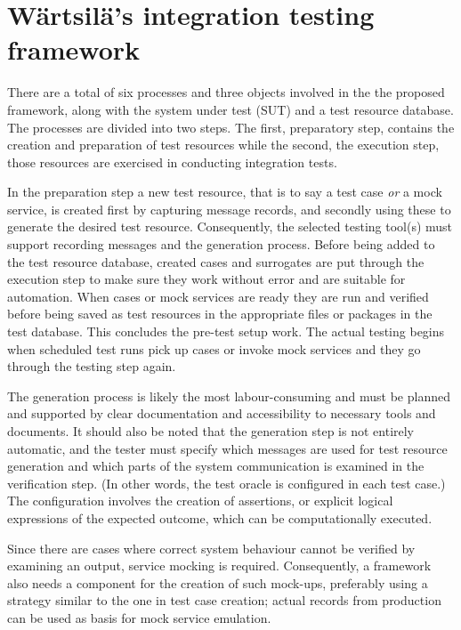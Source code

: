 \documentclass[12pt,a4paper,oneside,pdftex]{report}
\begin{document}
{\section{Wärtsilä's integration testing framework}

There are a total of six processes and three objects involved in the the proposed framework, along with the system under test (SUT) and a test resource database. The processes are divided into two steps. The first, preparatory step, contains the creation and preparation of test resources while the second, the execution step, those resources are exercised in conducting integration tests.

In the preparation step a new test resource, that is to say a test case \emph{or} a mock service, is created first by capturing message records, and secondly using these to generate the desired test resource. Consequently, 
the selected testing tool(s) must support recording messages and the generation process. Before being added to the test resource database, created cases and surrogates are put through the execution step to make sure they work without error and are suitable for automation. When cases or mock services are ready they are run and verified before being saved as test resources in the appropriate files or packages in the test database. This concludes the pre-test setup work. The actual testing begins when scheduled test runs pick up cases or invoke mock services and they go through the testing step again.

The generation process is likely the most labour-consuming and must be planned and supported by clear documentation and accessibility to necessary tools and documents. It should also be noted that the generation step is not entirely automatic, and the tester must specify which messages are used for test resource generation and which parts of the system communication is examined in the verification step. (In other words, the test oracle is configured in each test case.) The configuration involves the creation of assertions, or explicit logical expressions of the expected outcome, which can be computationally executed. 

Since there are cases where correct system behaviour cannot be verified by examining an output, service mocking is required. Consequently, a framework also needs a component for the creation of such mock-ups, preferably using a strategy similar to the one in test case creation; actual records from production can be used as basis for mock service emulation.

}
\end{document}
